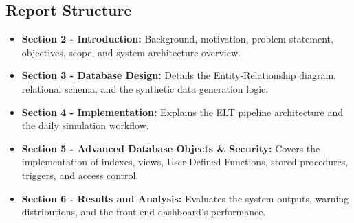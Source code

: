 \subsection{Report Structure}
\begin{itemize}
    \item \textbf{Section 2 - Introduction:} Background, motivation, problem statement, objectives, scope, and system architecture overview.
    \item \textbf{Section 3 - Database Design:} Details the Entity-Relationship diagram, relational schema, and the synthetic data generation logic.
    \item \textbf{Section 4 - Implementation:} Explains the ELT pipeline architecture and the daily simulation workflow.
    \item \textbf{Section 5 - Advanced Database Objects \& Security:} Covers the implementation of indexes, views, User-Defined Functions, stored procedures, triggers, and access control.
    \item \textbf{Section 6 - Results and Analysis:} Evaluates the system outputs, warning distributions, and the front-end dashboard's performance.
\end{itemize}